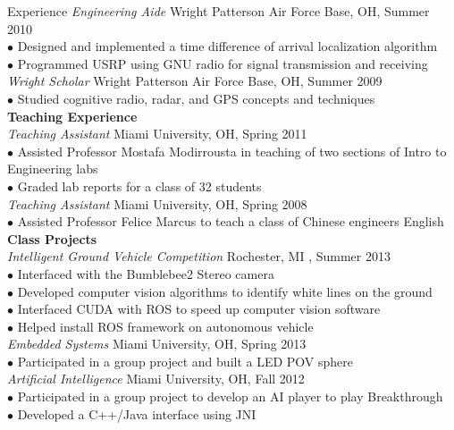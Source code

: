 \documentclass{resume} %
\begin{document}
\begin{rSection}{Experience}
  \textit{Engineering Aide} \hfill Wright Patterson Air Force Base, OH, Summer 2010 \\ [1 mm]
  $\bullet$ Designed and implemented a time difference of arrival localization algorithm \\
  $\bullet$ Programmed USRP using GNU radio for signal transmission and receiving \\[3 mm]
  \textit{Wright Scholar} \hfill Wright Patterson Air Force Base, OH, Summer 2009 \\ [1 mm]
  $\bullet$ Studied cognitive radio, radar, and GPS concepts and techniques \\[3 mm]
  \textbf{Teaching Experience}\\[1 mm]
  \textit{Teaching Assistant} \hfill Miami University, OH, Spring 2011 \\ [1 mm]
  $\bullet$ Assisted Professor Mostafa Modirrousta in teaching of two sections of Intro to Engineering labs\\
  $\bullet$ Graded lab reports for a class of 32 students \\ [3 mm]
  \textit{Teaching Assistant} \hfill Miami University, OH, Spring 2008 \\ [1 mm]
  $\bullet$ Assisted Professor Felice Marcus to teach a class of Chinese engineers English \\[3 mm]
  \textbf{Class Projects}\\[1 mm]
  \textit{Intelligent Ground Vehicle Competition} \hfill Rochester, MI , Summer 2013 \\ [1 mm]
  $\bullet$ Interfaced with the Bumblebee2 Stereo camera \\
  $\bullet$ Developed computer vision algorithms to identify white lines on the ground \\
  $\bullet$ Interfaced CUDA with ROS to speed up computer vision software \\
  $\bullet$ Helped install ROS framework on autonomous vehicle \\[1 mm]
  \textit{Embedded Systems} \hfill Miami University, OH, Spring 2013\\
  $\bullet$ Participated in a group project and built a LED POV sphere\\[1 mm]
  \textit{Artificial Intelligence} \hfill Miami University, OH, Fall 2012\\
  $\bullet$ Participated in a group project to develop an AI player to play Breakthrough\\
  $\bullet$ Developed a C++/Java interface using JNI\\ 

\end{rSection}
\end{document}
